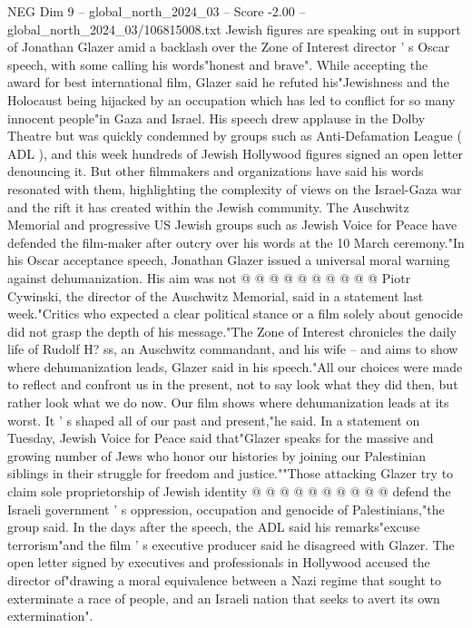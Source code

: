 \begin{textsample}{NEG Dim 9 – global\_north\_2024\_03 – Score -2.00 – global\_north\_2024\_03/106815008.txt}  \label{ex:f9_neg_178}
Jewish figures are speaking out in support of Jonathan Glazer amid a backlash over the Zone of Interest director ' s Oscar speech, with some calling his words"honest and brave".
While accepting the award for best international film, Glazer said he refuted his"Jewishness and the Holocaust being hijacked by an occupation which has led to conflict for so many innocent people"in Gaza and Israel.
His speech drew applause in the Dolby Theatre but was quickly condemned by groups such as Anti-Defamation League ( ADL ), and this week hundreds of Jewish Hollywood figures signed an open letter denouncing it.
But other filmmakers and organizations have said his words resonated with them, highlighting the complexity of views on the Israel-Gaza war and the rift it has created within the Jewish community.
The Auschwitz Memorial and progressive US Jewish groups such as Jewish Voice for Peace have defended the film-maker after outcry over his words at the 10 March ceremony."In his Oscar acceptance speech, Jonathan Glazer issued a universal moral warning against dehumanization.
His aim was not @ @ @ @ @ @ @ @ @ @ Piotr Cywinski, the director of the Auschwitz Memorial, said in a statement last week."Critics who expected a clear political stance or a film solely about genocide did not grasp the depth of his message."The Zone of Interest chronicles the daily life of Rudolf H? ss, an Auschwitz commandant, and his wife -- and aims to show where dehumanization leads, Glazer said in his speech."All our choices were made to reflect and confront us in the present, not to say look what they did then, but rather look what we do now.
Our film shows where dehumanization leads at its worst.
It ' s shaped all of our past and present,"he said.
In a statement on Tuesday, Jewish Voice for Peace said that"Glazer speaks for the massive and growing number of Jews who honor our histories by joining our Palestinian siblings in their struggle for freedom and justice.""Those attacking Glazer try to claim sole proprietorship of Jewish identity @ @ @ @ @ @ @ @ @ @ defend the Israeli government ' s oppression, occupation and genocide of Palestinians,"the group said.
In the days after the speech, the ADL said his remarks"excuse terrorism"and the film ' s executive producer said he disagreed with Glazer.
The open letter signed by executives and professionals in Hollywood accused the director of"drawing a moral equivalence between a Nazi regime that sought to exterminate a race of people, and an Israeli nation that seeks to avert its own extermination".

\end{textsample}

